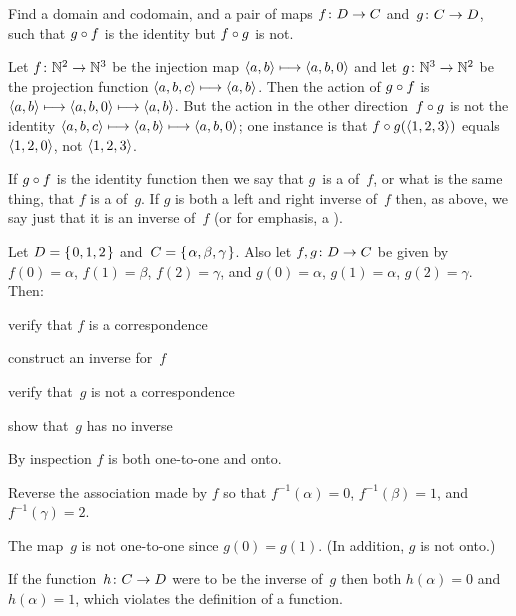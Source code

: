 \documentclass{test}  %
\begin{document}
\begin{ex}
  Find a domain and codomain, and a pair of maps $\mbox{$f\colon D\to C$}$ 
  and~$\mbox{$g\colon C\to D$}$,
  such that $g\mathbin{\circ} f$ is the identity but $f\mathbin{\circ} g$
  is not.
\begin{ans}
Let $\mbox{$f\colon \mathbb{N}^2\to \mathbb{N}^3$}$ be the injection map
$\langle a,b\rangle\stackrel{}{\longmapsto}\langle a,b,0\rangle$
and let 
$\mbox{$g\colon \mathbb{N}^3\to \mathbb{N}^2$}$ be the projection function
$\langle a,b,c\rangle\stackrel{}{\longmapsto}\langle a,b\rangle$.
Then the action of $g\mathbin{\circ} f$ is 
$\langle a,b\rangle\stackrel{}{\longmapsto}\langle a,b,0\rangle\stackrel{}{\longmapsto}\langle a,b\rangle$.
But the action in the other direction~$f\mathbin{\circ} g$ is not the identity
$\langle a,b,c\rangle\stackrel{}{\longmapsto}\langle a,b\rangle\stackrel{}{\longmapsto}\langle a,b,0\rangle$;
one instance is that $f\mathbin{\circ} g(\langle1,2,3\rangle)$ equals
$\langle1,2,0\rangle$, not $\langle1,2,3\rangle$.     
\end{ans}
\end{ex}

If $g\mathbin{\circ} f$ is the identity function then we say that 
$g$~is a  of~$f$\!, or what is the
same thing, that $f$ is a  of~$g$.
If $g$ is both a left and right inverse of~$f$ then, 
as above, we say just that it is
an inverse of~$f$ (or for emphasis, a ). 

\begin{ex}
Let $D=\mbox{$\{\hspace{0.1em}0,1,2\hspace{0.1em}\}$}$ and~$C=\mbox{$\{\hspace{0.1em}\alpha,\beta,\gamma\hspace{0.1em}\}$}$.
Also let $\mbox{$f,g\colon D\to C$}$ be given by
$f(0)=\alpha$, $f(1)=\beta$, $f(2)=\gamma$, and
$g(0)=\alpha$, $g(1)=\alpha$, $g(2)=\gamma$.
Then:
\begin{items}
\item verify that $f$ is a correspondence
\item construct an inverse for~$f$\!
\item verify that~$g$ is not a correspondence
\item show that~$g$ has no inverse 
\end{items}
\begin{ans}
\begin{items}
\item By inspection $f$ is both one-to-one and onto.
\item Reverse the association made by $f$ so that $f^{-1}(\alpha)=0$,
  $f^{-1}(\beta)=1$, and~$f^{-1}(\gamma)=2$.
\item The map~$g$ is not one-to-one since $g(0)=g(1)$.
  (In addition, $g$ is not onto.) 
\item If the function~$\mbox{$h\colon C\to D$}$ were to be the inverse of~$g$
  then both $h(\alpha)=0$ and~$h(\alpha)=1$, 
  which violates the definition of a function.   
\end{items}
\end{ans}
\end{ex}
\end{document}
